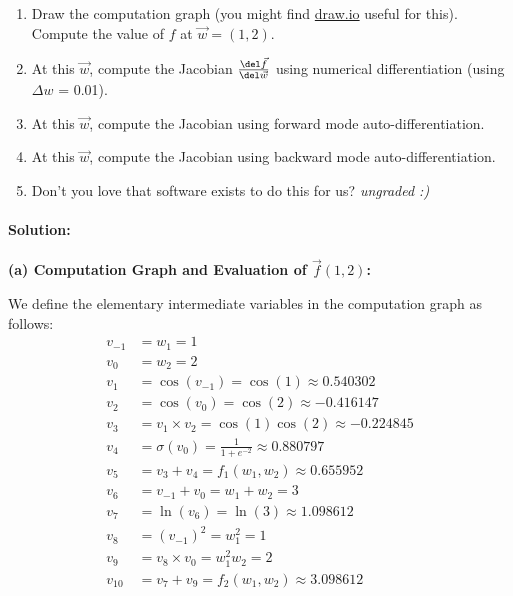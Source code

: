 \documentclass[11pt,english]{article}
\begin{document}
\begin{enumerate}[resume]
\begin{enumerate}
\item Draw the computation graph (you might find \href{https://draw.io/}{draw.io} useful for this). Compute the value of $f$ at $\vec{w} = (1, 2)$.
\item At this $\vec{w}$, compute the Jacobian $\frac{\del \vec{f}} {\del \vec{w}}$ using numerical differentiation (using $\Delta w$ = 0.01).
\item At this $\vec{w}$, compute the Jacobian using forward mode auto-differentiation.
\item At this $\vec{w}$, compute the Jacobian using backward mode auto-differentiation.
\item Don't you love that software exists to do this for us? \textit{ungraded :)}
\end{enumerate}

\paragraph{Solution:}

\textbf{(a) Computation Graph and Evaluation of $\vec{f}(1, 2)$:}

We define the elementary intermediate variables in the computation graph as follows:
\begin{align*}
    v_{-1} &= w_1 = 1 \\
    v_{0} &= w_2 = 2 \\
    v_1 &= \cos(v_{-1}) = \cos(1) \approx 0.540302 \\
    v_2 &= \cos(v_0) = \cos(2) \approx -0.416147 \\
    v_3 &= v_1 \times v_2 = \cos(1)\cos(2) \approx -0.224845 \\
    v_4 &= \sigma(v_0) = \frac{1}{1 + e^{-2}} \approx 0.880797 \\
    v_5 &= v_3 + v_4 = f_1(w_1, w_2) \approx 0.655952 \\
    v_6 &= v_{-1} + v_0 = w_1 + w_2 = 3 \\
    v_7 &= \ln(v_6) = \ln(3) \approx 1.098612 \\
    v_8 &= (v_{-1})^2 = w_1^2 = 1 \\
    v_9 &= v_8 \times v_0 = w_1^2 w_2 = 2 \\
    v_{10} &= v_7 + v_9 = f_2(w_1, w_2) \approx 3.098612
\end{align*}

\begin{center}
\end{center}
\end{enumerate}
\end{document}
